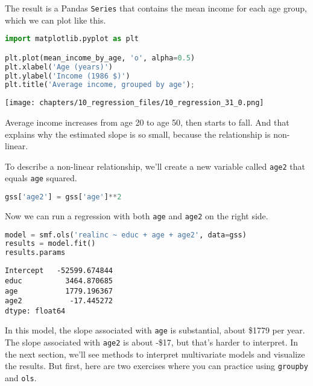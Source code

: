 The result is a Pandas \passthrough{\lstinline!Series!} that contains
the mean income for each age group, which we can plot like this.

\begin{lstlisting}[language=Python,style=source]
import matplotlib.pyplot as plt

plt.plot(mean_income_by_age, 'o', alpha=0.5)
plt.xlabel('Age (years)')
plt.ylabel('Income (1986 $)')
plt.title('Average income, grouped by age');
\end{lstlisting}

\begin{center}
\texttt{[image: chapters/10\_regression\_files/10\_regression\_31\_0.png]}
\end{center}

Average income increases from age 20 to age 50, then starts to fall. And
that explains why the estimated slope is so small, because the
relationship is non-linear.

To describe a non-linear relationship, we'll create a new variable
called \passthrough{\lstinline!age2!} that equals
\passthrough{\lstinline!age!} squared.

\begin{lstlisting}[language=Python,style=source]
gss['age2'] = gss['age']**2
\end{lstlisting}

Now we can run a regression with both \passthrough{\lstinline!age!} and
\passthrough{\lstinline!age2!} on the right side.

\begin{lstlisting}[language=Python,style=source]
model = smf.ols('realinc ~ educ + age + age2', data=gss)
results = model.fit()
results.params
\end{lstlisting}

\begin{lstlisting}[style=output]
Intercept   -52599.674844
educ          3464.870685
age           1779.196367
age2           -17.445272
dtype: float64
\end{lstlisting}

In this model, the slope associated with \passthrough{\lstinline!age!}
is substantial, about \$1779 per year. The slope associated with
\passthrough{\lstinline!age2!} is about -\$17, but that's harder to
interpret. In the next section, we'll see methods to interpret
multivariate models and visualize the results. But first, here are two
exercises where you can practice using \passthrough{\lstinline!groupby!}
and \passthrough{\lstinline!ols!}.

